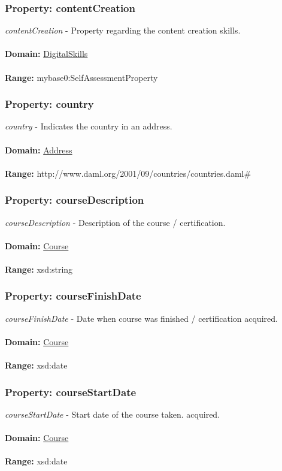 \documentclass[a4paper,12pt]{article}
\numberwithin{equation}{section}
\begin{document}
\subsubsection{Property: contentCreation}\hypertarget{contentCreation}{}
\textit{contentCreation} - Property regarding the content creation skills.
\\\\
\textbf{Domain:} \hyperlink{DigitalSkills}{DigitalSkills} 
\\\\
\textbf{Range:}  mybase0:SelfAssessmentProperty

\subsubsection{Property: country}\hypertarget{country}{}
\textit{country} - Indicates the country in an address.
\\\\
\textbf{Domain:} \hyperlink{Address}{Address} 
\\\\
\textbf{Range:}  http://www.daml.org/2001/09/countries/countries.daml\#

\subsubsection{Property: courseDescription}\hypertarget{courseDescription}{}
\textit{courseDescription} - Description of the course / certification.
\\\\
\textbf{Domain:} \hyperlink{Course}{Course} 
\\\\
\textbf{Range:}  xsd:string

\subsubsection{Property: courseFinishDate}\hypertarget{courseFinishDate}{}
\textit{courseFinishDate} - Date when course was finished / certification acquired.
\\\\
\textbf{Domain:} \hyperlink{Course}{Course} 
\\\\
\textbf{Range:}  xsd:date

\subsubsection{Property: courseStartDate}\hypertarget{courseStartDate}{}
\textit{courseStartDate} - Start date of the course taken. acquired.
\\\\
\textbf{Domain:} \hyperlink{Course}{Course} 
\\\\
\textbf{Range:}  xsd:date
\end{document}
